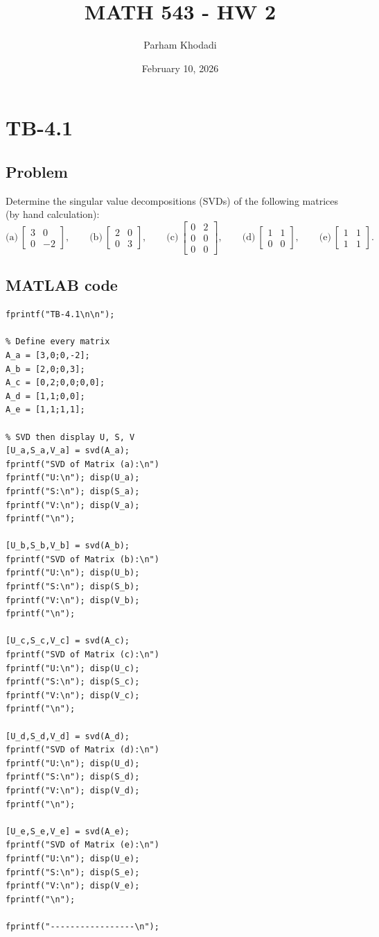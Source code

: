 \documentclass{article}
\title{MATH 543 - HW 2}
\author{Parham Khodadi}
\date{February 10, 2026}
\begin{document}
\maketitle

\section*{TB-4.1}
\subsection*{Problem}
Determine the singular value decompositions (SVDs) of the following matrices (by hand calculation):
\[
\text{(a)}\ \begin{bmatrix} 3 & 0 \\ 0 & -2 \end{bmatrix},\qquad
\text{(b)}\ \begin{bmatrix} 2 & 0 \\ 0 & 3 \end{bmatrix},\qquad
\text{(c)}\ \begin{bmatrix} 0 & 2 \\ 0 & 0 \\ 0 & 0 \end{bmatrix},\qquad
\text{(d)}\ \begin{bmatrix} 1 & 1 \\ 0 & 0 \end{bmatrix},\qquad
\text{(e)}\ \begin{bmatrix} 1 & 1 \\ 1 & 1 \end{bmatrix}.
\]


\subsection*{MATLAB code}
\begin{lstlisting}[caption={My MATLAB code for solving this question.}]
%% tb-4.1
fprintf("TB-4.1\n\n");

% Define every matrix
A_a = [3,0;0,-2];
A_b = [2,0;0,3];
A_c = [0,2;0,0;0,0];
A_d = [1,1;0,0];
A_e = [1,1;1,1];

% SVD then display U, S, V
[U_a,S_a,V_a] = svd(A_a);
fprintf("SVD of Matrix (a):\n")
fprintf("U:\n"); disp(U_a);
fprintf("S:\n"); disp(S_a);
fprintf("V:\n"); disp(V_a);
fprintf("\n");

[U_b,S_b,V_b] = svd(A_b);
fprintf("SVD of Matrix (b):\n")
fprintf("U:\n"); disp(U_b);
fprintf("S:\n"); disp(S_b);
fprintf("V:\n"); disp(V_b);
fprintf("\n");

[U_c,S_c,V_c] = svd(A_c);
fprintf("SVD of Matrix (c):\n")
fprintf("U:\n"); disp(U_c);
fprintf("S:\n"); disp(S_c);
fprintf("V:\n"); disp(V_c);
fprintf("\n");

[U_d,S_d,V_d] = svd(A_d);
fprintf("SVD of Matrix (d):\n")
fprintf("U:\n"); disp(U_d);
fprintf("S:\n"); disp(S_d);
fprintf("V:\n"); disp(V_d);
fprintf("\n");

[U_e,S_e,V_e] = svd(A_e);
fprintf("SVD of Matrix (e):\n")
fprintf("U:\n"); disp(U_e);
fprintf("S:\n"); disp(S_e);
fprintf("V:\n"); disp(V_e);
fprintf("\n");

fprintf("-----------------\n");
\end{lstlisting}
\end{document}
